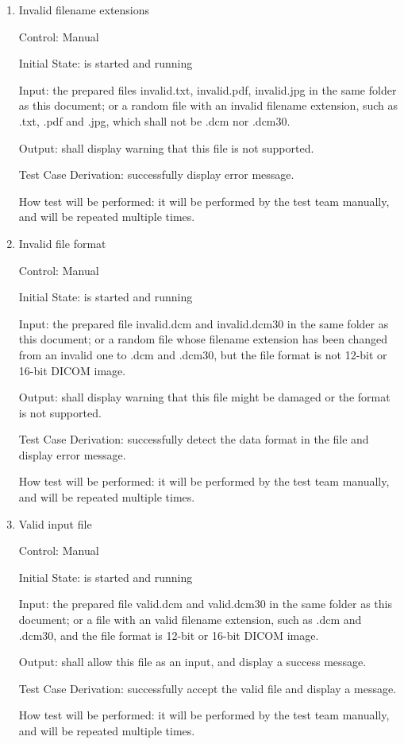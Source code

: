 \documentclass[12pt, titlepage]{article}
\begin{document}
\begin{enumerate}

\item{Invalid filename extensions}

Control: Manual
					
Initial State: \progname{} is started and running
					
Input: the prepared files invalid.txt, invalid.pdf, invalid.jpg in the same
folder as this document; or a random file with an invalid filename extension,
such as .txt, .pdf and .jpg, which shall not be .dcm nor .dcm30.
					
Output: \progname{} shall display warning that this file is not supported.

Test Case Derivation: successfully display error message.
					
How test will be performed: it will be performed by the test team manually, and
will be repeated multiple times.
					
\item{Invalid file format}

Control: Manual
					
Initial State: \progname{} is started and running
					
Input: the prepared file invalid.dcm and invalid.dcm30 in the same folder as
this document; or a random file whose filename extension has been changed from
an invalid one to .dcm and .dcm30, but the file format is not 12-bit or 16-bit
DICOM image.
					
Output: \progname{} shall display warning that this file might be damaged or the
format is not supported.

Test Case Derivation: successfully detect the data format in the file and
display error message.

How test will be performed: it will be performed by the test team manually, and
will be repeated multiple times.

\item{Valid input file}

Control: Manual
					
Initial State: \progname{} is started and running
					
Input: the prepared file valid.dcm and valid.dcm30 in the same folder as this
document; or a file with an valid filename extension, such as .dcm and .dcm30,
and the file format is 12-bit or 16-bit DICOM image.
					
Output: \progname{} shall allow this file as an input, and display a success
message.

Test Case Derivation: successfully accept the valid file and display a message.

How test will be performed: it will be performed by the test team manually, and
will be repeated multiple times.
\end{enumerate}
\end{document}
